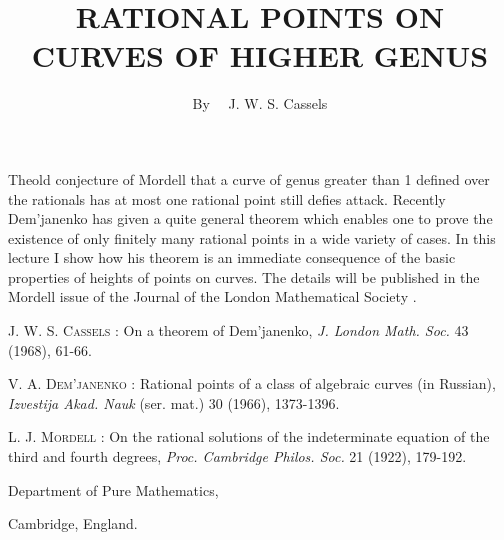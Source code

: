 \title{RATIONAL POINTS ON CURVES OF HIGHER GENUS}

\author{By~~ J. W. S. Cassels}

\date{}

\maketitle

\setcounter{pageoriginal}{82}
The\pageoriginale old conjecture of Mordell \cite{art06-key3} that a curve of genus greater than 1 defined over the rationals has at most one rational point still defies attack. Recently Dem'janenko \cite{art06-key2} has given a quite general theorem which enables one to prove the existence of only finitely many rational points in a wide variety of cases. In this lecture I show how his theorem is an immediate consequence of the basic properties of heights of points on curves. The details will be published in the Mordell issue of the Journal of the London Mathematical Society \cite{art06-key1}.

\begin{thebibliography}{99}
 \textsc{J. W. S. Cassels :} On a theorem of Dem'janenko, {\em J. London Math. Soc.} 43 (1968), 61-66.

 \textsc{V. A. Dem'janenko :} Rational points of a class of algebraic curves (in Russian), {\em Izvestija Akad. Nauk} (ser. mat.) 30 (1966), 1373-1396.

 \textsc{L. J. Mordell :} On the rational solutions of the indeterminate equation of the third and fourth degrees, {\em Proc. Cambridge Philos. Soc.} 21 (1922), 179-192.
\end{thebibliography}

\medskip
\noindent
{\small Department of Pure Mathematics,}

\noindent
{\small Cambridge, England.}
